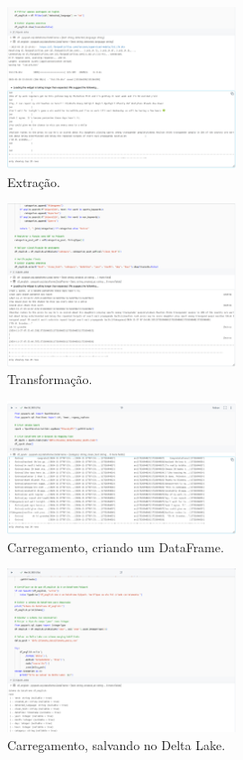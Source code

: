 \documentclass[
  letterpaper,
  DIV=11,
  numbers=noendperiod]{scrartcl}
\begin{document}
\begin{figure}[htbp]
    \centering
    \includegraphics[width=0.6\textwidth]{evidencias/evidencia3.png}
    \caption{Extração.}
    \label{fig:exemplo}
\end{figure}

\begin{figure}[htbp]
    \centering
    \includegraphics[width=0.6\textwidth]{evidencias/evidencia4.png}
    \caption{Transformação.}
    \label{fig:exemplo}
\end{figure}

\begin{figure}[htbp]
    \centering
    \includegraphics[width=0.6\textwidth]{evidencias/evidencia5.png}
    \caption{Carregamento, criando um DataFrame.}
    \label{fig:exemplo}
\end{figure}

\begin{figure}[htbp]
    \centering
    \includegraphics[width=0.6\textwidth]{evidencias/evidencia6.png}
    \caption{Carregamento, salvando no Delta Lake.}
    \label{fig:exemplo}
\end{figure}
\end{document}
